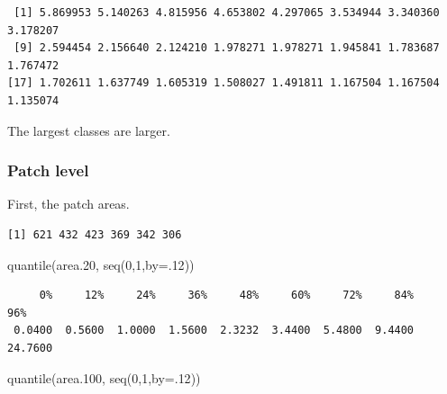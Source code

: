 \documentclass[
  letterpaper,
  DIV=11,
  numbers=noendperiod]{scrartcl}
\newenvironment{Shaded}{\begin{snugshade}}{\end{snugshade}}
\newcommand{\AttributeTok}[1]{\textcolor[rgb]{0.40,0.45,0.13}{#1}}
\newcommand{\CommentTok}[1]{\textcolor[rgb]{0.37,0.37,0.37}{#1}}
\newcommand{\ConstantTok}[1]{\textcolor[rgb]{0.56,0.35,0.01}{#1}}
\newcommand{\DecValTok}[1]{\textcolor[rgb]{0.68,0.00,0.00}{#1}}
\newcommand{\FloatTok}[1]{\textcolor[rgb]{0.68,0.00,0.00}{#1}}
\newcommand{\FunctionTok}[1]{\textcolor[rgb]{0.28,0.35,0.67}{#1}}
\newcommand{\NormalTok}[1]{\textcolor[rgb]{0.00,0.23,0.31}{#1}}
\newcommand{\OtherTok}[1]{\textcolor[rgb]{0.00,0.23,0.31}{#1}}
\newcommand{\SpecialCharTok}[1]{\textcolor[rgb]{0.37,0.37,0.37}{#1}}
\newcommand{\StringTok}[1]{\textcolor[rgb]{0.13,0.47,0.30}{#1}}
\begin{document}
\begin{verbatim}
 [1] 5.869953 5.140263 4.815956 4.653802 4.297065 3.534944 3.340360 3.178207
 [9] 2.594454 2.156640 2.124210 1.978271 1.978271 1.945841 1.783687 1.767472
[17] 1.702611 1.637749 1.605319 1.508027 1.491811 1.167504 1.167504 1.135074
\end{verbatim}

The largest classes are larger.

\hypertarget{patch-level-2}{%
\subsubsection{Patch level}\label{patch-level-2}}

First, the patch areas.

\begin{Shaded}
\end{Shaded}

\begin{verbatim}
[1] 621 432 423 369 342 306
\end{verbatim}

\begin{Shaded}
\begin{Highlighting}[]
\FunctionTok{quantile}\NormalTok{(area}\FloatTok{.20}\NormalTok{, }\FunctionTok{seq}\NormalTok{(}\DecValTok{0}\NormalTok{,}\DecValTok{1}\NormalTok{,}\AttributeTok{by=}\NormalTok{.}\DecValTok{12}\NormalTok{))}
\end{Highlighting}
\end{Shaded}

\begin{verbatim}
     0%     12%     24%     36%     48%     60%     72%     84%     96% 
 0.0400  0.5600  1.0000  1.5600  2.3232  3.4400  5.4800  9.4400 24.7600 
\end{verbatim}

\begin{Shaded}
\begin{Highlighting}[]
\FunctionTok{quantile}\NormalTok{(area}\FloatTok{.100}\NormalTok{, }\FunctionTok{seq}\NormalTok{(}\DecValTok{0}\NormalTok{,}\DecValTok{1}\NormalTok{,}\AttributeTok{by=}\NormalTok{.}\DecValTok{12}\NormalTok{))}
\end{Highlighting}
\end{Shaded}
\end{document}
